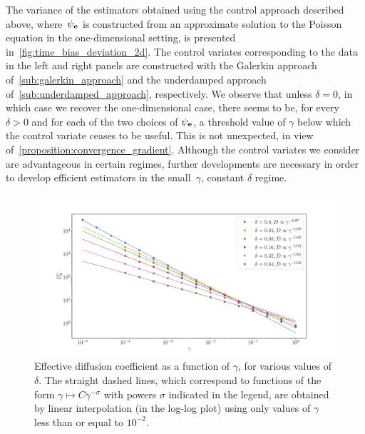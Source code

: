 \documentclass[11pt,a4paper]{article}
\begin{document}
The variance of the estimators obtained using the control approach described above,
where~$\psi_{\boldsymbol{\mathbf e}}$ is constructed from an approximate solution to the Poisson equation in the one-dimensional setting,
is presented in~\cref{fig:time_bias_deviation_2d}.
The control variates corresponding to the data in the left and right panels
are constructed with the Galerkin approach of~\cref{sub:galerkin_approach}
and the underdamped approach of~\cref{sub:underdamped_approach}, respectively.
We observe that unless $\delta = 0$, in which case we recover the one-dimensional case,
there seems to be, for every~$\delta > 0$ and for each of the two choices of $\psi_{\boldsymbol{\mathbf e}}$,
a threshold value of $\gamma$ below which the control variate ceases to be useful.
This is not unexpected, in view of~\cref{proposition:convergence_gradient}.
Although the control variates we consider are advantageous in certain regimes,
further developments are necessary in order to develop efficient estimators in the small~$\gamma$, constant $\delta$ regime.

\begin{figure}[ht]
    \centering
    \includegraphics[width=0.99\linewidth]{figures/diffusion.pdf}
    \caption{
        Effective diffusion coefficient as a function of $\gamma$,
        for various values of $\delta$.
        The straight dashed lines, which correspond to functions of the form $\gamma \mapsto C \gamma^{-\sigma}$ with powers $\sigma$ indicated in the legend,
        are obtained by linear interpolation (in the log-log plot) using only values of $\gamma$ less than or equal to $10^{-2}$.
    }%
    \label{fig:time_bias_variance_2d}
\end{figure}
\end{document}
